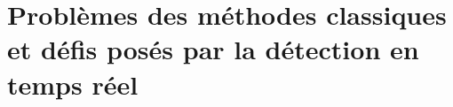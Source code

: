 \chapter{Problèmes des méthodes classiques et défis posés par la détection en temps réel}
    \section{}
        \subsection{}
            \subsubsection{}